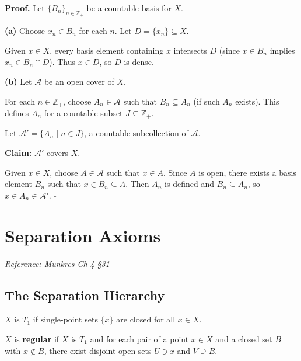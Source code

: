 \documentclass[11pt]{report}
\renewenvironment{proof}[1][Proof]{\noindent\textbf{#1.} }{\hfill$\square$\par\vspace{5pt}}
\begin{document}
\begin{proof}
Let $\{B_n\}_{n \in \mathbb{Z}_+}$ be a countable basis for $X$.

\textbf{(a)} Choose $x_n \in B_n$ for each $n$. Let $D = \{x_n\} \subseteq X$.

Given $x \in X$, every basis element containing $x$ intersects $D$ (since $x \in B_n$ implies $x_n \in B_n \cap D$). Thus $x \in \overline{D}$, so $D$ is dense.

\textbf{(b)} Let $\mathcal{A}$ be an open cover of $X$.

For each $n \in \mathbb{Z}_+$, choose $A_n \in \mathcal{A}$ such that $B_n \subseteq A_n$ (if such $A_n$ exists). This defines $A_n$ for a countable subset $J \subseteq \mathbb{Z}_+$.

Let $\mathcal{A}' = \{A_n \mid n \in J\}$, a countable subcollection of $\mathcal{A}$.

\textbf{Claim:} $\mathcal{A}'$ covers $X$.

Given $x \in X$, choose $A \in \mathcal{A}$ such that $x \in A$. Since $A$ is open, there exists a basis element $B_n$ such that $x \in B_n \subseteq A$. Then $A_n$ is defined and $B_n \subseteq A_n$, so $x \in A_n \in \mathcal{A}'$.
\end{proof}

\section{Separation Axioms}

\textit{Reference: Munkres Ch 4 \S 31}

\subsection{The Separation Hierarchy}

\begin{defbox}[$T_1$ Axiom]
$X$ is \textbf{$T_1$} if single-point sets $\{x\}$ are closed for all $x \in X$.
\end{defbox}

\begin{defbox}[Regular]
$X$ is \textbf{regular} if $X$ is $T_1$ and for each pair of a point $x \in X$ and a closed set $B$ with $x \notin B$, there exist disjoint open sets $U \ni x$ and $V \supseteq B$.
\end{defbox}
\end{document}
